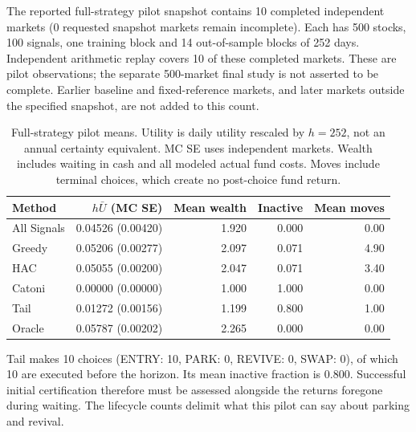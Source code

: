 The reported full-strategy pilot snapshot contains 10 completed independent markets (0 requested snapshot markets remain incomplete). Each has 500 stocks, 100 signals, one training block and 14 out-of-sample blocks of 252 days. Independent arithmetic replay covers 10 of these completed markets. These are pilot observations; the separate 500-market final study is not asserted to be complete. Earlier baseline and fixed-reference markets, and later markets outside the specified snapshot, are not added to this count.

\begin{table}[H]\centering\small

\begin{tabular}{lrrrr}

\toprule

Method & $h\bar U$ (MC SE) & Mean wealth & Inactive & Mean moves \\

\midrule

All Signals & 0.04526 (0.00420) & 1.920 & 0.000 & 0.00 \\

Greedy & 0.05206 (0.00277) & 2.097 & 0.071 & 4.90 \\

HAC & 0.05055 (0.00200) & 2.047 & 0.071 & 3.40 \\

Catoni & 0.00000 (0.00000) & 1.000 & 1.000 & 0.00 \\

Tail & 0.01272 (0.00156) & 1.199 & 0.800 & 1.00 \\

Oracle & 0.05787 (0.00202) & 2.265 & 0.000 & 0.00 \\

\bottomrule\end{tabular}

\caption{Full-strategy pilot means. Utility is daily utility rescaled by $h=252$, not an annual certainty equivalent. MC SE uses independent markets. Wealth includes waiting in cash and all modeled actual fund costs. Moves include terminal choices, which create no post-choice fund return.}\end{table}

Tail makes 10 choices (ENTRY: 10, PARK: 0, REVIVE: 0, SWAP: 0), of which 10 are executed before the horizon. Its mean inactive fraction is 0.800. Successful initial certification therefore must be assessed alongside the returns foregone during waiting. The lifecycle counts delimit what this pilot can say about parking and revival.

